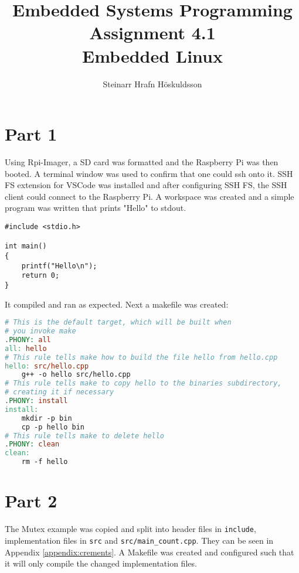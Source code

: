 \documentclass{article}
\title{Embedded Systems Programming \\ Assignment 4.1 \\ \large Embedded Linux}
\author{Steinarr Hrafn Höskuldsson}
\newcommand{\mycomment}[1]{}
\begin{document}
\pagestyle{firststyle}
{\let\newpage\relax\maketitle}

\mycomment{
\begin{figure}[h]
    \centering
    \texttt{[image: LAB3/Basic1.png]}
    \caption{"Switch test" Breadboard set up}
    \label{fig:Switch_test}
\end{figure}



}

\section*{Part 1}

Using Rpi-Imager, a SD card was formatted and the Raspberry Pi was then booted. A terminal window was used to confirm that one could ssh onto it. SSH FS extension for VSCode was installed and after configuring SSH FS, the SSH client could connect to the Raspberry Pi. A workspace was created and a simple program was written that prints "Hello" to stdout.

\begin{lstlisting}[caption={src/hello.cpp, writes "Hello" to stdout}]
#include <stdio.h>

int main()
{
    printf("Hello\n");
    return 0;
}
\end{lstlisting}

It compiled and ran as expected. Next a makefile was created:

\begin{lstlisting}[language=makefile, caption={Makefile for simple hello program}]
# This is the default target, which will be built when 
# you invoke make
.PHONY: all
all: hello
# This rule tells make how to build the file hello from hello.cpp
hello: src/hello.cpp
	g++ -o hello src/hello.cpp
# This rule tells make to copy hello to the binaries subdirectory,
# creating it if necessary
.PHONY: install
install:
	mkdir -p bin
	cp -p hello bin
# This rule tells make to delete hello 
.PHONY: clean 
clean:
	rm -f hello

\end{lstlisting}
\newpage
\section*{Part 2}
The Mutex example was copied and split into header files in \verb!include!, implementation files in \verb!src! and \verb!src/main_count.cpp!. They can be seen in Appendix \ref{appendix:crements}. A Makefile was created and configured such that it will only compile the changed implementation files.
\end{document}

